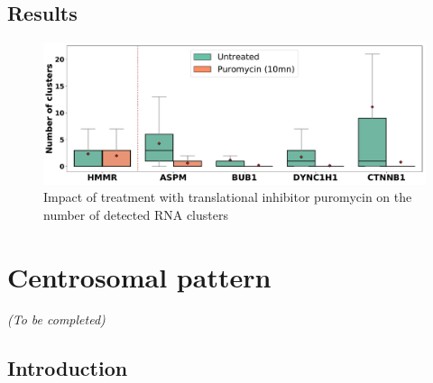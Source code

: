 \subsection{Results}
\label{subsec:results_translation_factories}

\begin{figure}[h]
    \centering
    \includegraphics[width=\textwidth]{figures/chapter5/plot_puromycin}
    \caption{Impact of treatment with translational inhibitor puromycin on the number of detected RNA clusters}
    \label{fig:plot_puromycin}
\end{figure}



\section{Centrosomal pattern}
\label{sec:centrosomal}

\begin{center}
	\textit{(To be completed)}
\end{center}

\subsection{Introduction}
\label{subsec:introduction_centrosomal}

